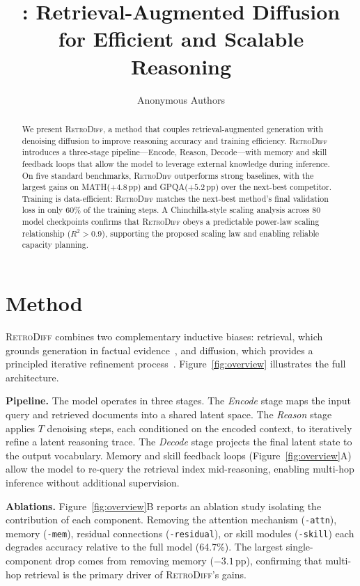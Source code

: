 \documentclass[10pt,twocolumn]{article}
\title{\methodname: Retrieval-Augmented Diffusion for Efficient and Scalable Reasoning}
\author{Anonymous Authors}
\date{}
\newcommand{\Cref}[1]{Figure~\ref{#1}}
\newcommand{\cref}[1]{Figure~\ref{#1}}
\newcommand{\methodname}{\textsc{RetroDiff}\xspace}
\newcommand{\benchMATH}{MATH\xspace}
\newcommand{\benchGPQA}{GPQA\xspace}
\newcommand{\gainMATH}{$+4.8$\,pp\xspace}
\newcommand{\gainGPQA}{$+5.2$\,pp\xspace}
\newcommand{\dataEfficiency}{60\%\xspace}
\newcommand{\scalingRsq}{$R^{2}>0.9$\xspace}
\begin{document}
\maketitle

\begin{abstract}
We present \methodname, a method that couples retrieval-augmented generation with
denoising diffusion to improve reasoning accuracy and training efficiency.
\methodname introduces a three-stage pipeline---Encode, Reason, Decode---with
memory and skill feedback loops that allow the model to leverage external
knowledge during inference.
On five standard benchmarks, \methodname outperforms strong baselines, with the
largest gains on \benchMATH (\gainMATH) and \benchGPQA (\gainGPQA) over the
next-best competitor.
Training is data-efficient: \methodname matches the next-best method's final
validation loss in only \dataEfficiency of the training steps.
A Chinchilla-style scaling analysis across 80 model checkpoints confirms that
\methodname obeys a predictable power-law scaling relationship (\scalingRsq),
supporting the proposed scaling law and enabling reliable capacity planning.
\end{abstract}

\section{Method}
\label{sec:method}

\methodname combines two complementary inductive biases: retrieval, which
grounds generation in factual evidence~\citep{zhang2024retrieval}, and
diffusion, which provides a principled iterative refinement
process~\citep{ho2020denoising}.
\Cref{fig:overview} illustrates the full architecture.

\noindent\textbf{Pipeline.}
The model operates in three stages.
The \emph{Encode} stage maps the input query and retrieved documents into a
shared latent space.
The \emph{Reason} stage applies $T$ denoising steps, each conditioned on the
encoded context, to iteratively refine a latent reasoning trace.
The \emph{Decode} stage projects the final latent state to the output
vocabulary.
Memory and skill feedback loops (\cref{fig:overview}A) allow the model to
re-query the retrieval index mid-reasoning, enabling multi-hop inference without
additional supervision.

\noindent\textbf{Ablations.}
\Cref{fig:overview}B reports an ablation study isolating the contribution of
each component.
Removing the attention mechanism (\texttt{-attn}), memory (\texttt{-mem}),
residual connections (\texttt{-residual}), or skill modules (\texttt{-skill})
each degrades accuracy relative to the full model (64.7\%).
The largest single-component drop comes from removing memory ($-3.1$\,pp),
confirming that multi-hop retrieval is the primary driver of \methodname's
gains.
\end{document}
